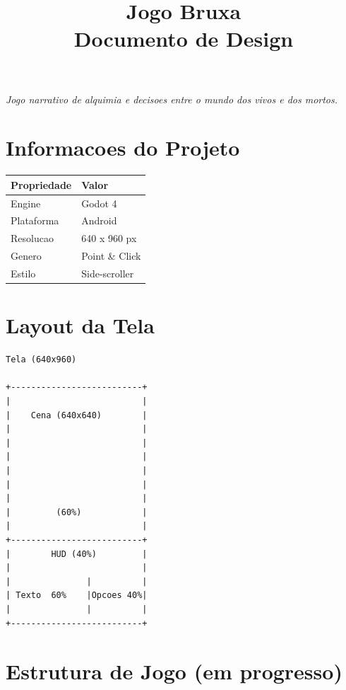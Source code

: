 \documentclass[12pt]{article}
\title{
    \Huge\textbf{Jogo Bruxa} \\
    \Large Documento de Design
}
\author{}
\date{}
\begin{document}
\maketitle

\begin{center}
\large \textit{Jogo narrativo de alquimia e decisoes entre o mundo dos vivos e dos mortos.}
\end{center}

\tableofcontents

\newpage



\section{Informacoes do Projeto}

\begin{tabular}{|l|l|}
\hline
\textbf{Propriedade} & \textbf{Valor} \\
\hline
Engine & Godot 4 \\
Plataforma & Android \\
Resolucao & 640 x 960 px \\
Genero & Point \& Click \\
Estilo & Side-scroller \\
\hline
\end{tabular}


\section{Layout da Tela}

\begin{verbatim}
Tela (640x960)

+--------------------------+
|                          |
|    Cena (640x640)        |
|                          |
|                          |
|                          |
|                          |
|                          |
|                          |
|         (60%)            |
|                          |
+--------------------------+
|        HUD (40%)         |
|                          |
|               |          |
| Texto  60%    |Opcoes 40%|
|               |          |
+--------------------------+
\end{verbatim}



\newpage
\section{Estrutura de Jogo (em progresso)}
\end{document}
